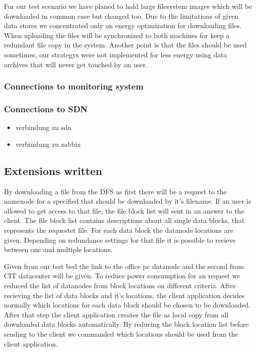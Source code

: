 
For our test scenario we have planed to hold large filesystem images which will be downloaded in common case but changed too. Due to the limitations of given data stores we concentrated only on energy optimization for downloading files. When uploading the files will be synchronized to both machines for keep a redundant file copy in the system.
Another point is that the files should be used sometimes, our strategys were not implemented for less energy using data archives that will never get touched by an user.

\subsubsection{Connections to monitoring system}



\subsubsection{Connections to SDN}

\begin{itemize}
\item verbindung zu sdn
\item verbindung zu zabbix
\end{itemize}

\subsection{Extensions written}

By downloading a file from the DFS as first there will be a request to the namenode for a specified that should be downloaded by it's filename. If an user is allowed to get access to that file, the file block list will sent in an answer to the client. The file block list contains descriptions about all single data blocks, that represents the requestet file. For each data block the datanode locations are given. Depending on redundance settings for that file it is possible to recieve between one and multiple locations. 

Given from our test bed the link to the office pc datanode and the second from CIT datacenter will be given. To reduce power consumption for an request we reduced the list of datanodes from block locations on different criteria. After recieving the list of data blocks and it's locations, the client application decides normally which locations for each data block should be chosen to be downloaded. After that step the client application creates the file as local copy from all downloaded data blocks automatically. By reducing the block location list before sending to the client we commanded which locations should be used from the client application.



